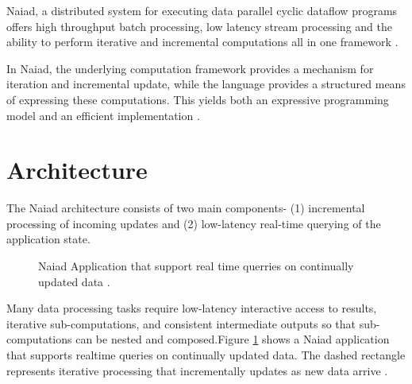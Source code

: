 \documentclass[9pt,twocolumn,twoside]{../../styles/osajnl}
\begin{document}
Naiad, a distributed system for executing data parallel cyclic
dataflow programs offers high throughput batch processing, low latency
stream processing and the ability to perform iterative and incremental
computations all in one framework \cite{www--blog-huula-review-naiad}.

In Naiad, the underlying computation framework provides a mechanism
for iteration and incremental update, while the language provides a
structured means of expressing these computations. This yields both an
expressive programming model and an efficient implementation
\cite{paper2-Naiad}.


\section{Architecture}

The Naiad architecture consists of two main components- (1)
incremental processing of incoming updates and (2) low-latency
real-time querying of the application state.
\begin{figure}[htbp]
\centering
{}
\caption{Naiad Application that support real time querries on
  continually updated data \cite{paper1-Naiad}.}
\label{Naiad-arch}
\end{figure}

Many data processing tasks require low-latency interactive access to
results, iterative sub-computations, and consistent intermediate
outputs so that sub-computations can be nested and composed.Figure
\ref{Naiad-arch} shows a Naiad application that supports realtime
queries on continually updated data. The dashed rectangle represents
iterative processing that incrementally updates as new data arrive
\cite{paper1-Naiad}.
\end{document}
